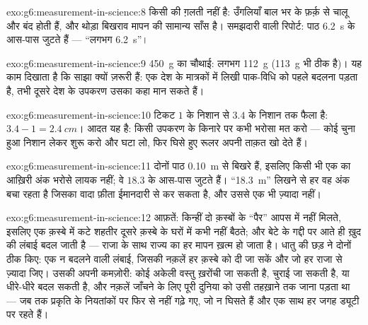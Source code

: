 \begin{solution}{exo:g6:measurement-in-science:8}
किसी की ग़लती नहीं है: उँगलियाँ बाल भर के फ़र्क़ से चालू और बंद होती
हैं, और थोड़ा बिखराव मापन की सामान्य साँस है। समझदारी वाली रिपोर्ट:
पाठ \qty{6.2}{s} के आस-पास जुटते हैं --- ``लगभग \qty{6.2}{s}''।
\end{solution}

\begin{solution}{exo:g6:measurement-in-science:9}
\qty{450}{g} का चौथाई: लगभग \qty{112}{g} (\qty{113}{g} भी ठीक है)।
यह काम दिखाता है कि साझा  क्यों ज़रूरी हैं: एक देश के मात्रकों
में लिखी पाक-विधि को पहले बदलना पड़ता है, तभी दूसरे देश के उपकरण उसका
कहा मान सकते हैं।
\end{solution}

\begin{solution}{exo:g6:measurement-in-science:10}
टिकट $1$ के निशान से $3.4$ के निशान तक फैला है: $3.4 - 1 =
\qty{2.4}{cm}$। आदत यह है: किसी उपकरण के किनारे पर कभी भरोसा मत करो
--- कोई चुना हुआ निशान लेकर शुरू करो और घटा लो, फिर घिसे हुए रूलर
अपनी ताक़त खो देते हैं।
\end{solution}

\begin{solution}{exo:g6:measurement-in-science:11}
दोनों पाठ \qty{0.10}{m} से बिखरे हैं, इसलिए किसी भी एक का आख़िरी अंक
भरोसे लायक नहीं; वे $18.3$ के आस-पास जुटते हैं।
``\qty{18.3}{m}'' लिखने से हर वह अंक बचा रहता है जिसका वादा फ़ीता
ईमानदारी से कर सकता है, और उससे एक भी ज़्यादा नहीं।
\end{solution}

\begin{solution}{exo:g6:measurement-in-science:12}
आफ़तें: किन्हीं दो क़स्बों के ``पैर'' आपस में नहीं मिलते, इसलिए एक
क़स्बे में कटे शहतीर दूसरे क़स्बे के घरों में कभी नहीं बैठते; और बेटे
के गद्दी पर आते ही ख़ुद  की लंबाई बदल जाती है --- राजा के साथ
राज्य का हर मापन ख़त्म हो जाता है। धातु की छड़ ने दोनों ठीक किए: एक न
बदलने वाली लंबाई, जिसकी नक़लें हर क़स्बे को दी जा सकें और जो हर राजा
से ज़्यादा जिए। उसकी अपनी कमज़ोरी: कोई अकेली वस्तु ख़रोंची जा सकती है,
चुराई जा सकती है, या धीरे-धीरे बदल सकती है, और नक़लें जाँचने के लिए
पूरी दुनिया को उसी तहख़ाने तक जाना पड़ता था --- जब तक  प्रकृति
के नियतांकों पर फिर से नहीं गढ़े गए, जो न घिसते हैं और एक साथ हर जगह
ड्यूटी पर रहते हैं।
\end{solution}

